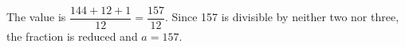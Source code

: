 The value is $\dfrac{144+12+1}{12}=\dfrac{157}{12}$. Since 157 is divisible by neither two nor three, the fraction is reduced and $\boxed{a=157}$.
